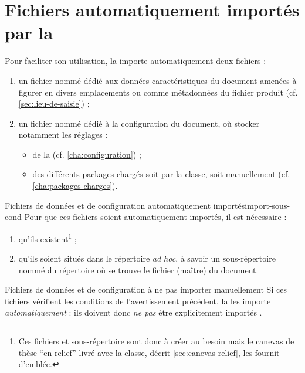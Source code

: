 \chapter{Fichiers automatiquement importés par la \yatcl{}}
\label{cha:fichiers-importes-par}

Pour faciliter son utilisation, la \yatcl{} importe automatiquement deux
fichiers :
\begin{enumerate}
\item un fichier nommé \file{\characteristicsfile} dédié aux données
  caractéristiques du document amenées à figurer en divers emplacements ou
  comme métadonnées du fichier \pdf produit (cf. \vref{sec:lieu-de-saisie}) ;
\item un fichier nommé \file{\configurationfile} dédié à la configuration du
  document, où stocker notamment les réglages :
  \begin{itemize}
  \item de la \yatcl (cf. \vref{cha:configuration}) ;
  \item des différents packages chargés soit par la classe, soit manuellement
    (cf. \vref{cha:packages-charges}).
  \end{itemize}
\end{enumerate}
\begin{dbwarning}{Fichiers de données et de configuration automatiquement importés}{import-sous-cond}
  Pour que ces fichiers
  soient automatiquement importés, il est nécessaire :
  \begin{enumerate}
  \item qu'ils existent\footnote{Ces fichiers et sous-répertoire sont donc
      à créer au besoin mais le canevas de thèse \enquote{en relief} livré avec
      la classe, décrit \vref{sec:canevas-relief}, les fournit d'emblée.} ;
  \item qu'ils soient situés dans le répertoire \emph{ad hoc}, à savoir un
    sous-répertoire nommé \directory{\configurationdirectory} du répertoire où
    se trouve le fichier (maître) du document.
  \end{enumerate}
\end{dbwarning}
\begin{dbwarning}{Fichiers de données et de configuration à ne pas importer manuellement}{}
  Si ces fichiers
  vérifient les conditions de l'avertissement précédent, la \yatcl{} les
  importe \emph{automatiquement} : ils doivent donc \emph{ne pas} être
  explicitement importés .
\end{dbwarning}
